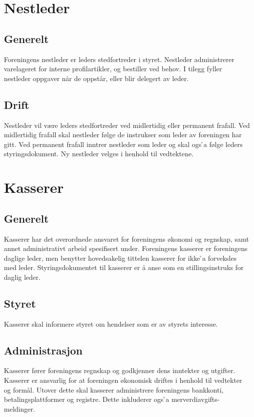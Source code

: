 \documentclass{article}
\begin{document}
\section{Nestleder}
\subsection{Generelt}
Foreningens nestleder er leders stedfortreder i styret. Nestleder administrerer varelageret for interne profilartikler, og bestiller ved behov. I tilegg fyller nestleder oppgaver når de oppstår, eller blir delegert av leder.

\subsection{Drift}
Nestleder vil være leders stedfortreder ved midlertidig eller permanent frafall. Ved midlertidig frafall skal nestleder følge de instrukser som leder av foreningen har gitt. Ved permanent frafall inntrer nestleder som leder og skal ogs ̊a følge leders styringsdokument. Ny nestleder velges i henhold til vedtektene.

\section{Kasserer}
\subsection{Generelt}
Kasserer har det overordnede ansvaret for foreningens økonomi og regnskap, samt annet administrativt arbeid spesifisert under. Foreningens kasserer er foreningens daglige leder, men benytter hovedsakelig tittelen kasserer for ikke  ̊a forveksles med leder. Styringsdokumentet til kasserer er å anse som en stillingsinstruks for daglig leder.

\subsection{Styret}
Kasserer skal informere styret om hendelser som er av styrets interesse.

\subsection{Administrasjon}
Kasserer fører foreningens regnskap og godkjenner dens inntekter og utgifter. Kasserer er ansvarlig for at foreningen økonomisk driftes i henhold til vedtekter og formål. Utover dette skal kasserer administrere foreningens bankkonti, betalingsplattformer og registre. Dette inkluderer ogs ̊a merverdiavgifts-meldinger.
\end{document}
